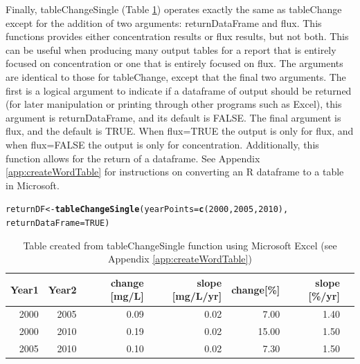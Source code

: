 \documentclass[a4paper,11pt]{article}\usepackage[]{graphicx}\usepackage[]{color}
\makeatletter
\newcommand{\hlnum}[1]{\textcolor[rgb]{0.686,0.059,0.569}{#1}}%
\newcommand{\hlstd}[1]{\textcolor[rgb]{0.345,0.345,0.345}{#1}}%
\newcommand{\hlkwb}[1]{\textcolor[rgb]{0.69,0.353,0.396}{#1}}%
\newcommand{\hlkwc}[1]{\textcolor[rgb]{0.333,0.667,0.333}{#1}}%
\newcommand{\hlkwd}[1]{\textcolor[rgb]{0.737,0.353,0.396}{\textbf{#1}}}%
\newenvironment{kframe}{%
 \def\at@end@of@kframe{}%
 \ifinner\ifhmode%
  \def\at@end@of@kframe{\end{minipage}}%
  \begin{minipage}{\columnwidth}%
 \fi\fi%
 \def\FrameCommand##1{\hskip\@totalleftmargin \hskip-\fboxsep
 \colorbox{shadecolor}{##1}\hskip-\fboxsep
     \hskip-\linewidth \hskip-\@totalleftmargin \hskip\columnwidth}%
 \MakeFramed {\advance\hsize-\width
   \@totalleftmargin\z@ \linewidth\hsize
   \@setminipage}}%
 {\par\unskip\endMakeFramed%
 \at@end@of@kframe}
\newenvironment{knitrout}{}{} %
\makeatother
\begin{document}
Finally, tableChangeSingle (Table \ref{table:tableChangeSingle}) operates exactly the same as tableChange except for the addition of two arguments: returnDataFrame and flux. This functions provides either concentration results or flux results, but not both.  This can be useful when producing many output tables for a report that is entirely focused on concentration or one that is entirely focused on flux.  The arguments are identical to those for tableChange, except that the final two arguments.  The first is a logical argument to indicate if a dataframe of output should be returned (for later manipulation or printing through other programs such as Excel), this argument is returnDataFrame, and its default is FALSE.  The final argument is flux, and the default is TRUE.  When flux=TRUE the output is only for flux, and when flux=FALSE the output is only for concentration.  Additionally, this function allows for the return of a dataframe.  See Appendix \ref{app:createWordTable} for instructions on converting an R dataframe to a table in Microsoft.

\begin{knitrout}
\color{fgcolor}\begin{kframe}
\begin{alltt}
\hlstd{returnDF} \hlkwb{<-} \hlkwd{tableChangeSingle}\hlstd{(}\hlkwc{yearPoints}\hlstd{=}\hlkwd{c}\hlstd{(}\hlnum{2000}\hlstd{,}\hlnum{2005}\hlstd{,}\hlnum{2010}\hlstd{),}
                              \hlkwc{returnDataFrame}\hlstd{=}\hlnum{TRUE}\hlstd{)}
\end{alltt}
\end{kframe}
\end{knitrout}


\begin{table}[ht]
\centering
\begin{tabular}{rrrrrrr}
  \hline
Year1 & Year2 & change [mg/L] & slope [mg/L/yr] & change[\%] & slope [\%/yr] \\ 
  \hline
2000 & 2005 & 0.09 & 0.02 & 7.00 & 1.40 \\ 
2000 & 2010 & 0.19 & 0.02 & 15.00 & 1.50 \\ 
2005 & 2010 & 0.10 & 0.02 & 7.30 & 1.50 \\ 
   \hline
\end{tabular}
\caption{Table created from tableChangeSingle function using Microsoft Excel (see Appendix \ref{app:createWordTable})} 
\label{table:tableChangeSingle}
\end{table}
\end{document}
